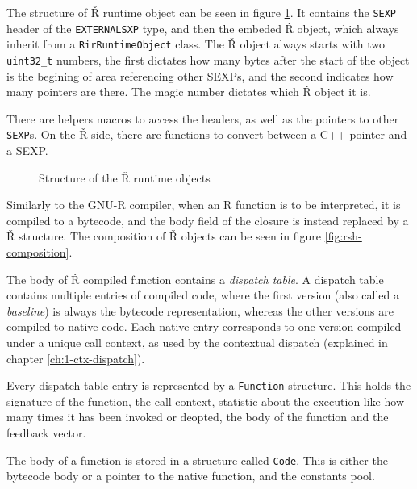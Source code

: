 The structure of Ř runtime object can be seen in figure \ref{fig:rsh-object-struct}. It contains the \texttt{SEXP} header of the \texttt{EXTERNALSXP} type, and then the embeded Ř object, which always inherit from a \texttt{RirRuntimeObject} class. The Ř object always starts with two \texttt{uint32\_t} numbers, the first dictates how many bytes after the start of the object is the begining of area referencing other SEXPs, and the second indicates how many pointers are there. The magic number dictates which Ř object it is.

There are helpers macros to access the headers, as well as the pointers to other \texttt{SEXP}s. On the Ř side, there are functions to convert between a C++ pointer and a SEXP.

\begin{figure}
	\centering
	\begin{adjustbox}{trim=10 80pt 0 0, clip}
	\end{adjustbox}
	\caption{Structure of the Ř runtime objects}\label{fig:rsh-object-struct}
\end{figure}

Similarly to the GNU-R compiler, when an R function is to be interpreted, it is compiled to a bytecode, and the body field of the closure is instead replaced by a Ř structure. The composition of Ř objects can be seen in figure \ref{fig:rsh-composition}.

The body of Ř compiled function contains a \textit{dispatch table}. A dispatch table contains multiple entries of compiled code, where the first version (also called a \textit{baseline}) is always the bytecode representation, whereas the other versions are compiled to native code. Each native entry corresponds to one version compiled under a unique call context, as used by the contextual dispatch (explained in chapter \ref{ch:1-ctx-dispatch}).

Every dispatch table entry is represented by a \texttt{Function} structure. This holds the signature of the function, the call context, statistic about the execution like how many times it has been invoked or deopted, the body of the function and the feedback vector.

The body of a function is stored in a structure called \texttt{Code}. This is either the bytecode body or a pointer to the native function, and the constants pool.

